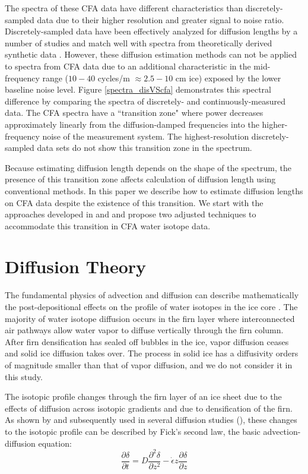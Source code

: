 \documentclass[draft, jgrga]{AGUTeX}
\begin{document}
\begin{article}
The spectra of these CFA data have different characteristics than discretely-sampled data due to their higher resolution and greater signal to noise ratio. Discretely-sampled data have been effectively analyzed for diffusion lengths by a number of studies \citep{Johnsen2000,Simonsen2011,Gkinis2014,vanderWel2015} and match well with spectra from theoretically derived synthetic data \citep{Holme2017}. However, these diffusion estimation methods can not be applied to spectra from CFA data due to an additional characteristic in the mid-frequency range ($10-40$ cycles/m $\approx 2.5-10$ cm ice) exposed by the lower baseline noise level. Figure \ref{spectra_disVScfa} demonstrates this spectral difference by comparing the spectra of discretely- and continuously-measured data. The CFA spectra have a ``transition zone" where power decreases approximately linearly from the diffusion-damped frequencies into the higher-frequency noise of the measurement system. The highest-resolution discretely-sampled data sets do not show this transition zone in the spectrum.

Because estimating diffusion length depends on the shape of the spectrum, the presence of this transition zone affects calculation of diffusion length using conventional methods. In this paper we describe how to estimate diffusion lengths on CFA data despite the existence of this transition. We start with the approaches developed in \citet{Johnsen2000} and \citet{Gkinis2014} and propose two adjusted techniques to accommodate this transition in CFA water isotope data.


\section{Diffusion Theory}

The fundamental physics of advection and diffusion can describe mathematically the post-depositional effects on the profile of water isotopes in the ice core \citep{Johnsen1977}. The majority of water isotope diffusion occurs in the firn layer where interconnected air pathways allow water vapor to diffuse vertically through the firn column. After firn densification has sealed off bubbles in the ice, vapor diffusion ceases and solid ice diffusion takes over. The process in solid ice has a diffusivity orders of magnitude smaller than that of vapor diffusion, and we do not consider it in this study.

The isotopic profile changes through the firn layer of an ice sheet due to the effects of diffusion across isotopic gradients and due to densification of the firn. As shown by \citet{Johnsen1977} and subsequently used in several diffusion studies (\citep{Johnsen2000, Simonsen2011, Gkinis2014, vanderWel2015, Jones2017a, Holme2017}), these changes to the isotopic profile can be described by Fick's second law, the basic advection-diffusion equation:
\begin{equation}
\frac{\partial \delta}{\partial t}
= D \frac{\partial ^2 \delta}{\partial z^2}
- \dot{\epsilon}
z \frac{\partial \delta}{\partial z}
\end{equation}


\end{article}
\end{document}
